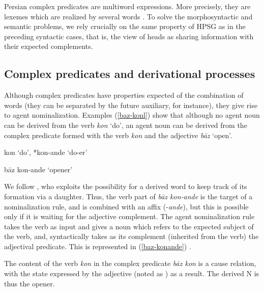 \documentclass[output=paper]{langsci/langscibook}
\begin{document}
	 Persian complex predicates are multiword expressions. More precisely, they are lexemes which are realized by several words \citep{BS2010}. To solve the morphosyntactic and semantic problems, we rely crucially on the same property of HPSG as in the preceding syntactic cases, that is, the view of heads as sharing information with their expected complements. 
	
	\subsection{Complex predicates and derivational processes}
	
	
	Although complex predicates have properties expected of the combination of words (they can be separated by the future auxiliary, for instance), they give rise to agent nominalization. Examples (\ref{baz-konl}) show that although no agent noun can be derived from the verb  \textit{kon} `do', an agent noun can be derived from the complex predicate formed with the verb  \textit{kon} and the adjective  \textit{b\=az} `open'. 
	
	
	
	
	\begin{exe}
		\ex \label{baz-konl}
		\begin{xlist} 
			
			\ex kon `do', *kon-ande `do-er'
			
			\ex b\=az kon-ande `opener'
			
		\end{xlist}
	\end{exe}
	
	We follow \cite{MuellerPersian-unlinked}, who exploits the possibility for a derived word to keep track of its formation via a daughter. Thus,  the verb part of \textit{b\=az kon-ande} is the target of a nominalization rule, and is combined with an affix (-\textit{ande}), but this is possible only if it is waiting for the adjective complement. The agent nominalization rule takes the verb as input and gives a noun which refers to the expected subject of the verb, and, syntactically takes as its complement (inherited from the verb) the adjectival predicate. This is represented in (\ref{baz-konande}) \citep[adapted from][]{MuellerPersian-unlinked}.
	
	The content of the verb \textit{kon} in the complex predicate \textit{b\=az kon} is a cause relation, with the state expressed by the adjective (noted as ) as a result. The derived N is thus the opener.
	
\end{document}
